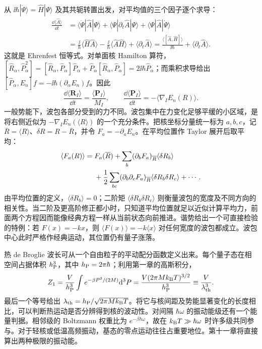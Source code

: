 从 $\ii\hbar|\dot\Psi\rangle=\hat H|\Psi\rangle$ 及其共轭转置出发，对平均值的三个因子逐个求导：
\begin{align}
\frac{\dd\langle\hat A\rangle}{\dd t}
&=\langle\dot\Psi|\hat A|\Psi\rangle
+\langle\Psi|\partial_t\hat A|\Psi\rangle
+\langle\Psi|\hat A|\dot\Psi\rangle\\
&=\frac{\ii}{\hbar}\langle\hat H\hat A\rangle
-\frac{\ii}{\hbar}\langle\hat A\hat H\rangle
+\langle\partial_t\hat A\rangle
=\frac{\langle[\hat A,\hat H]\rangle}{\ii\hbar}
+\langle\partial_t\hat A\rangle.
\end{align}
这就是 Ehrenfest 恒等式。对单面核 Hamilton 算符，$[\hat R_\alpha,\hat P_\alpha^2]=[\hat R_\alpha,\hat P_\alpha]\hat P_\alpha+\hat P_\alpha[\hat R_\alpha,\hat P_\alpha]=2\ii\hbar\hat P_\alpha$；而乘积求导给出 $[\hat P_\alpha,E_n]f=-\ii\hbar(\partial_\alpha E_n)f$。因此
\begin{equation}
\frac{\dd\langle\bm R_I\rangle}{\dd t}=\frac{\langle\bm P_I\rangle}{M_I},\qquad
\frac{\dd\langle\bm P_I\rangle}{\dd t}=-\langle\nabla_I E_n(R)\rangle.
\end{equation}
一般势能下，波包各部分受到的力不同。波包集中在力变化足够平缓的小区域，是将右侧近似为 $-\nabla_I E_n(\langle R\rangle)$ 的一个充分条件。把核坐标分量统一标为 $a,b,c$，记 $\overline R=\langle R\rangle$、$\delta R=R-\overline R$，并令 $F_a=-\partial_a E_n$。在平均位置作 Taylor 展开后取平均：
\begin{align}
\langle F_a(R)\rangle={}&F_a(\overline R)
+\sum_b(\partial_bF_a)_{\overline R}\langle\delta R_b\rangle\notag\\
&+\frac12\sum_{bc}(\partial_b\partial_cF_a)_{\overline R}
\langle\delta R_b\delta R_c\rangle+\cdots.
\end{align}
由平均位置的定义，$\langle\delta R_b\rangle=0$；二阶矩 $\langle\delta R_b\delta R_c\rangle$ 则衡量波包的宽度及不同方向的相关性。当二阶及更高阶修正都小时，只知道平均位置就足以近似计算平均力，前面两个方程因而能像经典方程一样从当前状态向前推进。谐势给出一个可直接检验的特例：若 $F(x)=-kx$，则 $\langle F(x)\rangle=-k\langle x\rangle$ 对任何宽度的波包都成立。波包中心此时严格作经典运动，其位置仍有量子涨落。

热 de Broglie 波长可从一个自由粒子的平动配分函数定义出来。每个量子态在相空间占据体积 $h_{\rm P}^3$，其中 $h_{\rm P}=2\pi\hbar$；利用第一章的高斯积分，
\begin{equation}
Z_1=\frac{V}{h_{\rm P}^3}\int e^{-\beta P^2/(2M)}\mathrm{d}^3P
=\frac{V(2\pi Mk_{\mathrm B} T)^{3/2}}{h_{\rm P}^3}
\equiv\frac{V}{\lambda_{\rm th}^3}.
\end{equation}
最后一个等号给出 $\lambda_{\rm th}=h_{\rm P}/\sqrt{2\pi Mk_{\mathrm B} T}$。将它与核间距及势能显著变化的长度相比，可以判断热运动是否分辨得到核的波动性。对间隔 $\hbar\omega$ 的振动能级还有一个能量判据。相邻级的 Boltzmann 权重比为 $e^{-\beta\hbar\omega}$，故在 $k_{\mathrm B} T\gg\hbar\omega$ 时许多级共同参与。对于轻核或低温高频振动，基态的零点运动往往占重要地位。第十一章将直接算出两种极限的振动能。

